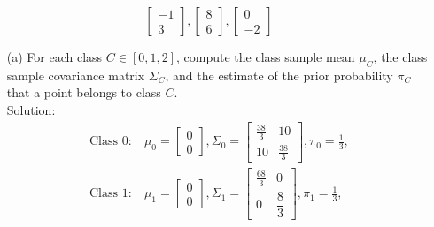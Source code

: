 \documentclass[10pt]{article}
\begin{document}
\begin{enumerate}[1.]
\begin{scriptsize}
\begin{equation*}
\begin{bmatrix}
                      -1 \\
                      3
                  \end{bmatrix},
                  \begin{bmatrix}
                      8 \\
                      6
                  \end{bmatrix},
                  \begin{bmatrix}
                      0 \\
                      -2
                  \end{bmatrix}
              \end{equation*}
          \end{scriptsize}
          \begin{itemize}
              \item[(a)] For each class $C \in [0, 1, 2]$, compute the class sample mean $\mu_C$, the class sample covariance matrix $\Sigma_C$, and the estimate
                    of the prior probability $\pi_C$ that a point belongs to class $C$. ~ \\
                    {\color{blue}Solution:
                    \begin{align*}
                        \text{Class 0}: & \ \mu_0 =
                        \begin{bmatrix}
                            0 \\
                            0
                        \end{bmatrix},\Sigma_0 =\begin{bmatrix}
                            \frac{38}{3} & 10           \\
                            10           & \frac{38}{3}
                        \end{bmatrix}, \pi_0 =\frac{1}{3},   \\
                        \text{Class 1}: &  \ \mu_1 =
                        \begin{bmatrix}
                            0 \\
                            0
                        \end{bmatrix},\Sigma_1 = \begin{bmatrix}
                            \frac{68}{3} & 0            \\
                            0            & \dfrac{8}{3}
                        \end{bmatrix}, \pi_1 = \frac{1}{3}, \\

\end{align*}}
\end{itemize}
\end{enumerate}
\end{document}
